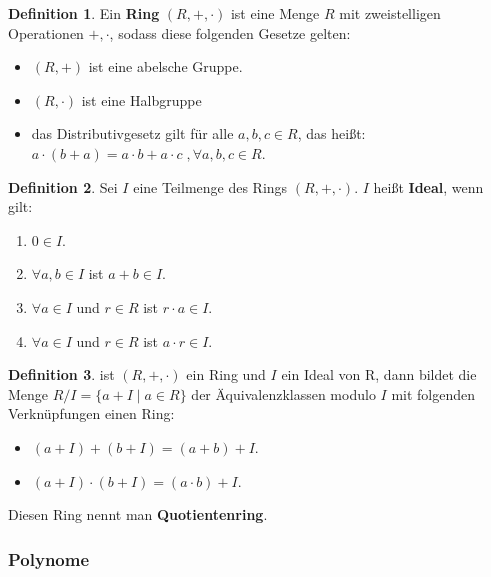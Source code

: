 \documentclass[12pt,oneside]{article}
\theoremstyle{remark}
\theoremstyle{definition}
\newtheorem{definition}{Definition}[section]
\begin{document}
\smallskip

\begin{definition}
Ein \textbf{Ring} $(R,+,\cdot)$ ist eine Menge $R$ mit zweistelligen Operationen $+, \cdot$, sodass diese folgenden Gesetze gelten:
\begin{itemize}
    \item $(R,+)$ ist eine abelsche Gruppe.
    \item $(R,\cdot)$ ist eine Halbgruppe
    \item das Distributivgesetz gilt für alle $a,b,c \in R$, das heißt: $a \cdot (b + a) = a \cdot b + a \cdot c \; ,\forall a,b,c \in R$.
\end{itemize}
\end{definition}

\smallskip


\begin{definition}
Sei $I$ eine Teilmenge des Rings $(R,+,\cdot)$. $I$ heißt \textbf{Ideal}, wenn gilt:
\begin{enumerate}
    \item $0 \in I$.
    \item $\forall a,b \in I$ ist $a + b \in I$.
    \item $\forall a \in I$ und $r \in R$ ist $r \cdot a \in I$.
    \item $\forall a \in I$ und $r \in R$ ist $a \cdot r \in I$.
\end{enumerate}
\end{definition}

\smallskip 

\begin{definition}
ist $(R, +, \cdot)$ ein Ring und $I$ ein Ideal von R, dann bildet die Menge $R/I = \{ a + I \mid a \in R\}$ der Äquivalenzklassen modulo $I$ mit folgenden Verknüpfungen einen Ring:
\begin{itemize}
    \item $(a + I) + (b + I) = (a + b) + I$.
    \item $(a + I) \cdot (b + I) = (a \cdot b ) + I$.\newline
\end{itemize}
Diesen Ring nennt man \textbf{Quotientenring}. 
\end{definition}

\smallskip



\subsubsection{Polynome}
\end{document}
